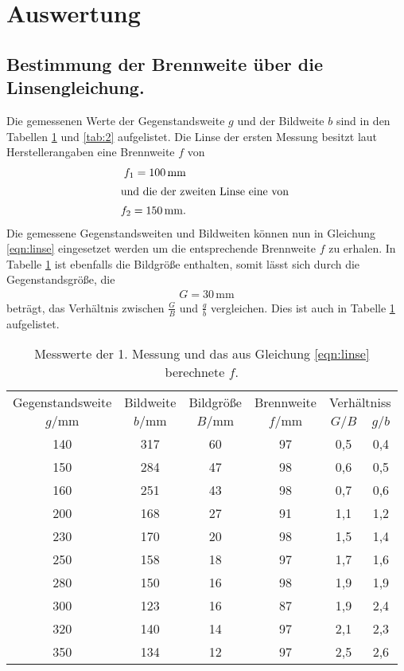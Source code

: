 \section{Auswertung}
\label{sec:Auswertung}
\subsection{Bestimmung der Brennweite über die Linsengleichung.}
\label{sec:1}
Die gemessenen Werte der Gegenstandsweite $g$ und der Bildweite $b$  sind
in den Tabellen \ref{tab:1} und \ref{tab:2} aufgelistet.
Die Linse der ersten Messung besitzt laut Herstellerangaben eine Brennweite $f$
von
\begin{align*}
  f_1=100\,\si{\milli\meter}\\
\intertext{und die der zweiten Linse eine von }
  f_2=150\,\si{\milli\meter}.
\end{align*}
Die gemessene Gegenstandsweiten und Bildweiten können nun in Gleichung
\eqref{eqn:linse} eingesetzet werden um die entsprechende Brennweite $f$
zu erhalen.
In Tabelle \ref{tab:1}  ist ebenfalls
die Bildgröße enthalten, somit lässt sich durch die Gegenstandsgröße, die
\begin{align*}
  G=30\,\si{\milli\meter}
\end{align*}
beträgt, das Verhältnis zwischen $\frac{G}{B}$ und $\frac{g}{b}$ vergleichen. Dies ist auch
in Tabelle \ref{tab:1} aufgelistet.
\begin{table}
  \centering
  \caption{Messwerte der 1. Messung und das aus Gleichung
   \eqref{eqn:linse} berechnete $f$.}
  \label{tab:1}
  \begin{tabular}{c c c c c c}
  \toprule
  Gegenstandsweite   & Bildweite & Bildgröße & Brennweite & \multicolumn{2}{c}{Verhältniss}\\
  $g/\si{\milli\meter}$ & $b/\si{\milli\meter}$ & $B/\si{\milli\meter}$& $f/\si{\milli\meter}$& $G/B$ &$g/b$\\
  \midrule
  140   &   317  &   60 & 97 &0,5 &0,4 \\
  150   &   284  &   47 & 98 &0,6 &0,5 \\
  160   &   251  &   43 & 98 &0,7 &0,6 \\
  200   &   168  &   27 & 91 &1,1 &1,2 \\
  230   &   170  &   20 & 98 &1,5 &1,4 \\
  250   &   158  &   18 & 97 &1,7 &1,6 \\
  280   &   150  &   16 & 98 &1,9 &1,9 \\
  300   &   123  &   16 & 87 &1,9 &2,4 \\
  320   &   140  &   14 & 97 &2,1 &2,3 \\
  350   &   134  &   12 & 97 &2,5 &2,6 \\
  \bottomrule
 \end{tabular}
\end{table}
